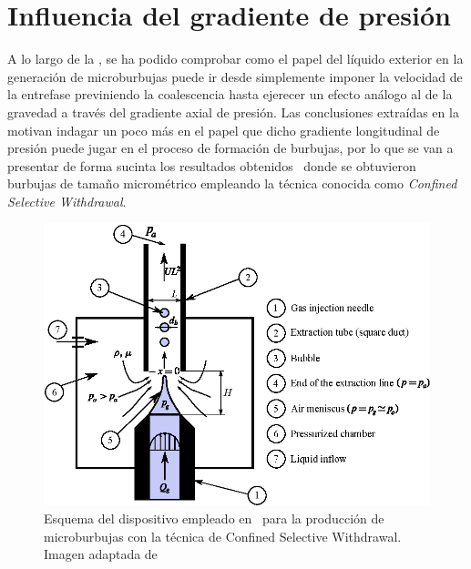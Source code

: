 \section{Influencia del gradiente de presión}

A lo largo de la , se ha podido comprobar como el papel del líquido exterior en la generación de microburbujas puede ir desde simplemente imponer la velocidad de la entrefase previniendo la coalescencia hasta ejerecer un efecto análogo al de la gravedad a través del gradiente axial de presión. Las conclusiones extraídas en la  motivan indagar un poco más en el papel que dicho gradiente longitudinal de presión puede jugar en el proceso de formación de burbujas, por lo que se van a presentar de forma sucinta los resultados obtenidos~\cite{Evangelio2015b} donde se obtuvieron burbujas de tamaño micrométrico empleando la técnica conocida como \emph{Confined Selective Withdrawal}.

\begin{figure}[hbtp!]
\includegraphics[scale=1]{introduccion/figuras/esquemaCSW.eps}
\caption{Esquema del dispositivo empleado en~\cite{Evangelio2015b} para la producción de microburbujas con la técnica de Confined Selective Withdrawal. Imagen adaptada de~\cite{Evangelio2015b}}
\end{figure}

